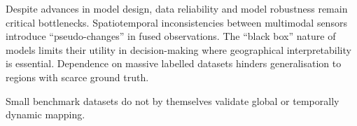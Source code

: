 \documentclass[]{interact}
\theoremstyle{plain}%
\theoremstyle{definition}
\theoremstyle{remark}
\DeclareRobustCommand{\DIFadd}[1]{{\protect\color{DIFaddcolor}\uwave{#1}}}
\DeclareRobustCommand{\DIFdel}[1]{{\protect\color{DIFdelcolor}\sout{#1}}}
\def\DIFadd#1{#1}%
\def\DIFdel#1{}%
\begin{document}
Despite \DIFdel{achieving} \DIFdel{record-breaking} \DIFdel{classification} \DIFdel{accuracies} \DIFadd{advances} \DIFadd{in} \DIFadd{model} \DIFadd{design}, \DIFdel{significant} \DIFdel{challenges} \DIFdel{remain} \DIFdel{regarding} data reliability and model robustness \DIFadd{remain} \DIFadd{critical} \DIFadd{bottlenecks}. \DIFdel{The} \DIFdel{spatiotemporal} \DIFadd{Spatiotemporal} inconsistencies between \DIFdel{multi-modal} \DIFadd{multimodal} sensors \DIFdel{continue} \DIFdel{to} introduce ``pseudo-changes'' in \DIFdel{simulation} \DIFdel{results} \DIFadd{fused} \DIFadd{observations}. \DIFdel{Moreover}\DIFdel{,} \DIFdel{the} \DIFadd{The} ``black box'' nature of \DIFdel{current} \DIFdel{state-of-the-art} models limits their utility in decision-making \DIFdel{processes} where geographical interpretability is essential. \DIFdel{The} \DIFdel{high} \DIFdel{dependence} \DIFadd{Dependence} on massive \DIFdel{labeled} \DIFadd{labelled} datasets \DIFdel{also} hinders \DIFdel{the} \DIFdel{generalization} \DIFdel{of} \DIFdel{these} \DIFdel{models} \DIFadd{generalisation} to regions \DIFdel{where} \DIFdel{ground-truth} \DIFdel{data} \DIFdel{is} \DIFadd{with} scarce \DIFadd{ground} \DIFadd{truth}.

\DIFdel{Looking} \DIFdel{forward}\DIFdel{,} \DIFdel{this} \DIFadd{Small} \DIFadd{benchmark} \DIFadd{datasets} \DIFadd{do} \DIFadd{not} \DIFadd{by} \DIFadd{themselves} \DIFadd{validate} \DIFadd{global} \DIFadd{or} \DIFadd{temporally} \DIFadd{dynamic} \DIFadd{mapping}\DIFadd{.}
\end{document}
